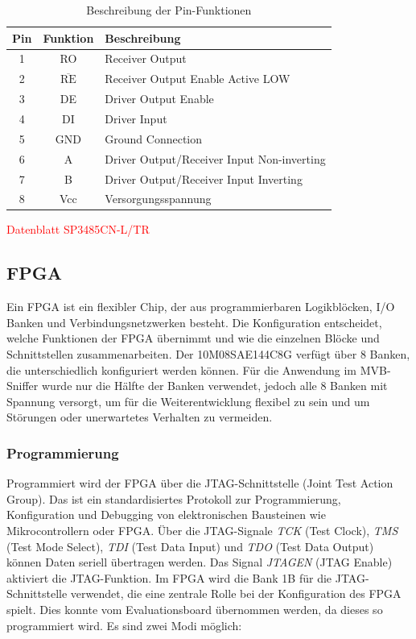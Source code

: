 \begin{table}[h]
  \centering
  \begin{tabular}{|c|c|l|}
    \hline
    \textbf{Pin} & \textbf{Funktion} & \textbf{Beschreibung} \\ \hline
    1 & RO & Receiver Output \\ \hline
    2 & $\overline{\text{RE}}$ & Receiver Output Enable Active LOW \\ \hline
    3 & DE & Driver Output Enable \\ \hline
    4 & DI & Driver Input \\ \hline
    5 & GND & Ground Connection \\ \hline
    6 & A & Driver Output/Receiver Input Non-inverting \\ \hline
    7 & B & Driver Output/Receiver Input Inverting\\ \hline
    8 & Vcc & Versorgungsspannung \\ \hline
  \end{tabular}
  \caption{Beschreibung der Pin-Funktionen}
  \label{tab:pin_funktionen}
\end{table}

\textcolor{red}{Datenblatt SP3485CN-L/TR} 

\subsection{FPGA}
Ein FPGA ist ein flexibler Chip, der aus programmierbaren Logikblöcken, I/O Banken und Verbindungsnetzwerken besteht. Die Konfiguration entscheidet, welche Funktionen der FPGA übernimmt und wie die einzelnen Blöcke und Schnittstellen zusammenarbeiten. Der 10M08SAE144C8G verfügt über 8 Banken, die unterschiedlich konfiguriert werden können. Für die Anwendung im MVB-Sniffer wurde nur die Hälfte der Banken verwendet, jedoch alle 8 Banken mit Spannung versorgt, um für die Weiterentwicklung flexibel zu sein und um Störungen oder unerwartetes Verhalten zu vermeiden. 
\

\subsubsection{Programmierung}

Programmiert wird der FPGA über die JTAG-Schnittstelle (Joint Test Action Group). Das ist ein standardisiertes Protokoll zur Programmierung, Konfiguration und Debugging von elektronischen Bausteinen wie Mikrocontrollern oder FPGA. Über die JTAG-Signale \textit{TCK} (Test Clock), \textit{TMS} (Test Mode Select), \textit{TDI} (Test Data Input) und \textit{TDO} (Test Data Output) können Daten seriell übertragen werden. Das Signal \textit{JTAGEN} (JTAG Enable) aktiviert die JTAG-Funktion. Im FPGA wird die Bank 1B für die JTAG-Schnittstelle verwendet, die eine zentrale Rolle bei der Konfiguration des FPGA spielt. Dies konnte vom Evaluationsboard übernommen werden, da dieses so programmiert wird. Es sind zwei Modi möglich:

